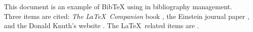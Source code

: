 \documentclass{article}
\begin{document}
	This document is an example of BibTeX using in bibliography management. Three items are cited: \textit{The \LaTeX\ Companion} book \cite{latexcompanion}, the Einstein journal paper \cite{einstein}, and the Donald Knuth's website \cite{knuthwebsite}. The \LaTeX\ related items are \cite{latexcompanion,knuthwebsite}.
	
	
\end{document}
